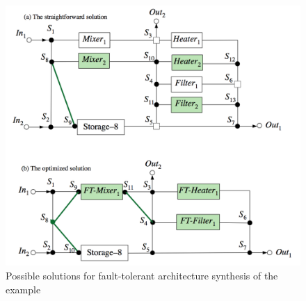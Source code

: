 \begin{figure}
\centering
\includegraphics[scale=0.4]{figures/motivational-example-specific-fm.png}
\caption[Possible solutions for fault-tolerant architecture synthesis of the example]{Possible solutions for fault-tolerant architecture synthesis of the example}
\label{fig:motivational-solution}
\end{figure}

